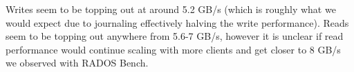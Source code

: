 
Writes seem to be topping out at around 5.2 GB/s (which is roughly what we
would expect due to journaling effectively halving the write performance).
Reads seem to be topping out anywhere from 5.6-7 GB/s, however it is unclear
if read performance would continue scaling with more clients and get closer to
8 GB/s we observed with RADOS Bench.

\begin{comment}
\subsection{Metadata Performance Tuning}
For brevity's sake, we are omitting most of our file and directory creation
rate results.  However, over the course of our testing we did notice that in
CephFS 0.64 a significant improvement in the performance of file creation with
mdtest.  Shown in Figure~\ref{fig:mdtest-064-file-create}, we note
that as number of clients increase, the file creation rate does not scale
linearly, which suggested some form of lock contention.  Due to the large
differences in the initially observed performance, and the performance with
Ceph 0.64, opportunities for file and directory create tuning may be
substantial. 

\begin{figure}[htb]
\centering
\texttt{[image: mdtest-064-file-create]}
\caption{mdtest of file creation on Ceph 0.64}
\label{fig:mdtest-064-file-create}
\end{figure}

\end{comment}
